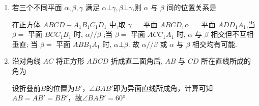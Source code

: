 \begin{enumerate}
\begin{jieda}
    \end{jieda}
    \item 若三个不同平面 $\alpha,\beta,\gamma$ 满足 $\alpha  \bot  \gamma,\beta  \bot  \gamma$,则 $\alpha$ 与 $\beta$ 间的位置关系是 
    \begin{jieda}
        在正方体 ${ABCD} - {A}_{1}{B}_{1}{C}_{1}{D}_{1}$ 中,取 $\gamma  =$ 平面 ${ABCD},\alpha  =$ 平面 ${AD}{D}_{1}{A}_{1}$,当 $\beta  =$ 平面 ${BC}{C}_{1}{B}_{1}$ 时, $\alpha //\beta$ ;当 $\beta  =$ 平面 ${AC}{C}_{1}{A}_{1}$ 时, $\alpha$ 与 $\beta$ 相交但不互相垂直; 当 $\beta  =$ 平面 ${AB}{B}_{1}{A}_{1}$ 时, $\alpha  \bot  \beta$. 故 $\alpha //\beta$ 或 $\alpha$ 与 $\beta$ 相交均有可能.
    \end{jieda}
    
    \item 沿对角线 ${AC}$ 将正方形 ${ABCD}$ 折成直二面角后, ${AB}$ 与 ${CD}$ 所在直线所成的角为
    \begin{jieda}
        设折叠前$B$的位置为$B'$，$\angle{BAB'}$即为异面直线所成角，计算可知$AB = AB' = BB'$，故$\angle{BAB'} = \ang{60}$
    \end{jieda}
\end{enumerate}
